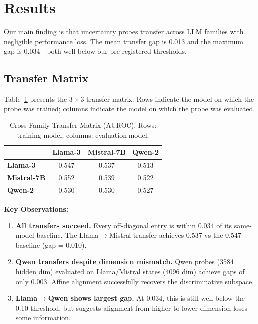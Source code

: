 \section{Results}

Our main finding is that uncertainty probes transfer across LLM families with negligible performance loss. The mean transfer gap is 0.013 and the maximum gap is 0.034---both well below our pre-registered thresholds.

\subsection{Transfer Matrix}

Table~\ref{tab:transfer} presents the $3 \times 3$ transfer matrix. Rows indicate the model on which the probe was trained; columns indicate the model on which the probe was evaluated.

\begin{table}[h]
\centering
\caption{Cross-Family Transfer Matrix (AUROC). Rows: training model; columns: evaluation model.}
\label{tab:transfer}
\begin{tabular}{@{}lccc@{}}
\toprule
 & Llama-3 & Mistral-7B & Qwen-2 \\
\midrule
\textbf{Llama-3} & 0.547 & 0.537 & 0.513 \\
\textbf{Mistral-7B} & 0.552 & 0.539 & 0.522 \\
\textbf{Qwen-2} & 0.530 & 0.530 & 0.527 \\
\bottomrule
\end{tabular}
\end{table}

\textbf{Key Observations:}

\begin{enumerate}
\item \textbf{All transfers succeed.} Every off-diagonal entry is within 0.034 of its same-model baseline. The Llama$\to$Mistral transfer achieves 0.537 vs the 0.547 baseline (gap = 0.010).

\item \textbf{Qwen transfers despite dimension mismatch.} Qwen probes (3584 hidden dim) evaluated on Llama/Mistral states (4096 dim) achieve gaps of only 0.003. Affine alignment successfully recovers the discriminative subspace.

\item \textbf{Llama$\to$Qwen shows largest gap.} At 0.034, this is still well below the 0.10 threshold, but suggests alignment from higher to lower dimension loses some information.
\end{enumerate}

